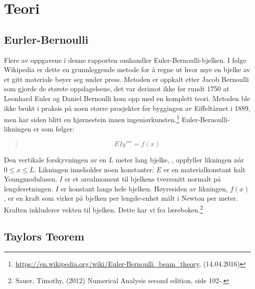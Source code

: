 \section{Teori}

\subsection{Eurler-Bernoulli}
Flere av oppgavene i denne rapporten omhandler Euler-Bernoulli-bjelken. I følge Wikipedia er dette en grunnleggende metode for å regne ut hvor mye en bjelke av et gitt materiale bøyer seg under press. Metoden er oppkalt etter Jacob Bernoulli som gjorde de største oppdagelsene, det var derimot ikke før rundt 1750 at Leonhard Euler og Daniel Bernoulli kom opp med en komplett teori. Metoden ble ikke brukt i praksis på noen større prosjekter før byggingen av Eiffeltårnet i 1889, men har siden blitt en hjørnestein innen ingeniørkunsten.\footnote{\url{https://en.wikipedia.org/wiki/Euler-Bernoulli_beam_theory}, (14.04.2016)} Euler-Bernoulli-likningen er som følger:
\begin{quote}
\begin{equation}
EIy''''=f(x)
\end{equation}
\end{quote}
Den vertikale forskyvningen av en $L$ meter lang bjelke, , oppfyller likningen når $0\leq x\leq L$. Likningen inneholder noen konstanter; $E$ er en materialkonstant kalt Youngmodulusen. $I$ er et arealmoment til bjelkens tverrsnitt normalt på lengderetningen. $I$ er konstant langs hele bjelken. Høyresiden av likningen, $f(x)$, er en kraft som virker på bjelken per lengde-enhet målt i Newton per meter. Kraften inkluderer vekten til bjelken. Dette har vi fra læreboken.\footnote{Sauer, Timothy, (2012) Numerical Analysis second edition, side 102-.}
\subsection{Taylors Teorem} 
 